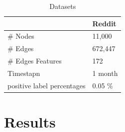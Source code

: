 \documentclass{IEEEtran}
\begin{document}
\begin{table}[htbp]
\caption{\label{Datasets}Datasets}
\centering
\begin{tabular}{ll}
\hline
\hline
 & Reddit\\
\hline
\# Nodes & 11,000\\
\# Edges & 672,447\\
\# Edges Features & 172\\
Timestapn & 1 month\\
positive label percentages & 0.05 \%\\
\end{tabular}
\end{table}
\section{Results}
\label{sec:orgc9e2c2a}
\printbibliography
\end{document}
